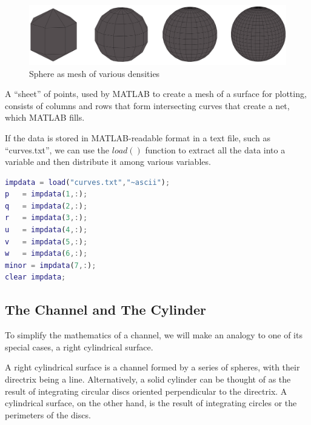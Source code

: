 \documentclass[a4paper]{article}
\begin{document}
\begin{figure}[h]
    \centering
    \includegraphics[width=\linewidth]{Images/Sphere_Mesh_Gray.png}
    \caption{Sphere as mesh of various densities}
\end{figure}

A “sheet” of points, used by MATLAB to create a mesh of a surface for plotting, consists of columns and rows that form intersecting curves that create a net, which MATLAB fills.

If the data is stored in MATLAB-readable format in a text file, such as “curves.txt”, we can use the \(load()\) function to extract all the data into a variable and then distribute it among various variables.
\\
\begin{lstlisting}[language=matlab]
impdata = load("curves.txt","~ascii");
p   = impdata(1,:);
q   = impdata(2,:);
r   = impdata(3,:);
u   = impdata(4,:);
v   = impdata(5,:);
w   = impdata(6,:);
minor = impdata(7,:);
clear impdata;

\end{lstlisting}
\hypertarget{the-channel-and-the-cylinder}{%
\subsection{The Channel and The
Cylinder}\label{the-channel-and-the-cylinder}}

To simplify the mathematics of a channel, we will make an analogy to one of its special cases, a right cylindrical surface.

A right cylindrical surface is a channel formed by a series of spheres, with their directrix being a line. Alternatively, a solid cylinder can be thought of as the result of integrating circular discs oriented perpendicular to the directrix. A cylindrical surface, on the other hand, is the result of integrating circles or the perimeters of the discs.
\end{document}
